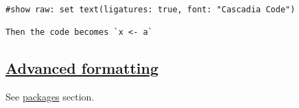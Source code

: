 \begin{verbatim}
#show raw: set text(ligatures: true, font: "Cascadia Code")

Then the code becomes `x <- a`
\end{verbatim}

\pandocbounded{}

\subsection{\texorpdfstring{\hyperref[advanced-formatting]{Advanced
formatting}}{Advanced formatting}}\label{advanced-formatting}

See \href{../packages/code.html}{packages} section.
